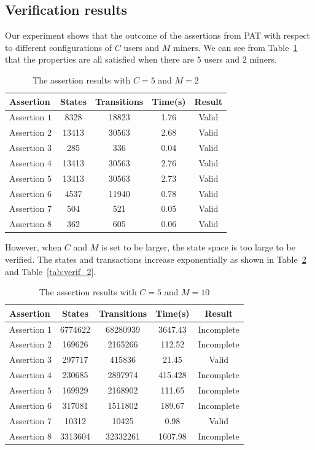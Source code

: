 \documentclass{KERauth}
\begin{document}
\subsection{Verification results}
Our experiment shows that the outcome of the assertions from PAT with respect to different configurations of $C$ users and $M$ miners. We can see from Table~\ref{tab:verification} that the properties are all satisfied when there are
$5$ users and $2$ miners. 
%
\begin{table}[h]
    \centering
    \begin{tabular}{l|c|c|c|c}
    \hline
    {\bf Assertion} &{\bf States}& {\bf Transitions} &{\bf Time}(s)& {\bf Result}\\
    \hline
Assertion $1$ &8328 &18823 &1.76 &Valid\\
Assertion $2$ & 13413 &30563& 2.68 &Valid\\
Assertion $3$ &285 &336& 0.04& Valid\\
Assertion $4$ &13413 &30563& 2.76 &Valid\\
Assertion $5$ &13413 &30563 &2.73& Valid\\
Assertion $6$ &4537 &11940 &0.78 &Valid\\
Assertion $7$ &504& 521 &0.05 &Valid\\
Assertion $8$& 362 &605& 0.06 &Valid\\
\hline
    \end{tabular}
    \caption{The assertion results with $C = 5$ and $M = 2$}
    \label{tab:verification}
\end{table}
%
However, when $C$ and $M$ is set to be larger, the state space is too large to be verified. The states and transactions increase exponentially as shown in Table~\ref{tab:verif_1} and Table~\ref{tab:verif_2}.

\begin{table}[h]
    \centering
    \begin{tabular}{l|c|c|c|c}
    \hline
      Assertion &States &Transitions& Time(s) &Result\\
      \hline
Assertion $1$ & 6774622& 68280939 &3647.43 &Incomplete\\
Assertion $2$ & 169626 & 2165266 & 112.52 & Incomplete\\
Assertion $3$ & 297717 & 415836 & 21.45 & Valid\\
Assertion $4$ & 230685 & 2897974 & 415.428 & Incomplete\\
Assertion $5$ & 169929 & 2168902 & 111.65 & Incomplete\\
Assertion $6$ & 317081 & 1511802 & 189.67 & Incomplete\\
Assertion $7$ & 10312 & 10425 & 0.98 & Valid\\
Assertion $8$ & 3313604 & 32332261 & 1607.98 & Incomplete\\
\hline
    \end{tabular}
    \caption{The assertion results with $C = 5$ and $M = 10$}
    \label{tab:verif_1}
\end{table}
\end{document}
